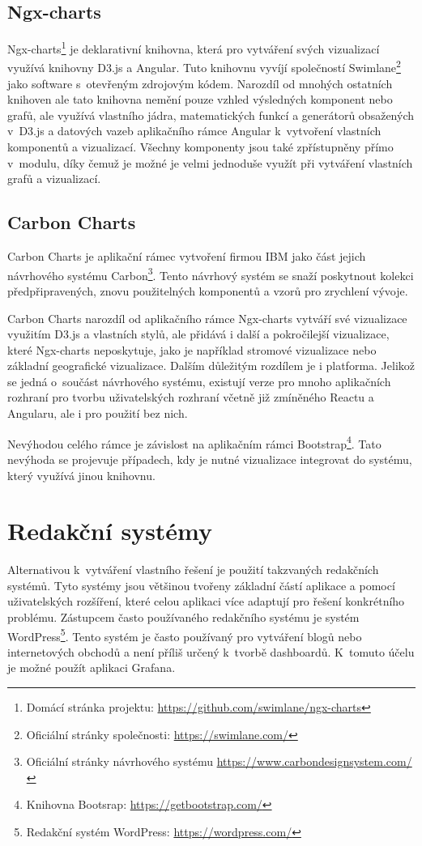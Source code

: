 \subsection*{Ngx-charts}
Ngx-charts\footnote{Domácí stránka projektu: \url{https://github.com/swimlane/ngx-charts}} je deklarativní knihovna, která pro vytváření svých vizualizací využívá knihovny D3.js a Angular. Tuto knihovnu vyvíjí společností Swimlane\footnote{Oficiální stránky společnosti: \url{https://swimlane.com/}} jako software s~otevřeným zdrojovým kódem. Narozdíl od mnohých ostatních knihoven ale tato knihovna nemění pouze vzhled výsledných komponent nebo grafů, ale využívá vlastního jádra, matematických funkcí a generátorů obsažených v~D3.js a datových vazeb aplikačního rámce Angular k~vytvoření vlastních komponentů a vizualizací. Všechny komponenty jsou také zpřístupněny přímo v~modulu, díky čemuž je možné je velmi jednoduše využít při vytváření vlastních grafů a vizualizací.

\subsection*{Carbon Charts}
Carbon Charts je aplikační rámec vytvoření firmou IBM jako část jejich návrhového systému Carbon\footnote{Oficiální stránky návrhového systému \url{https://www.carbondesignsystem.com/}}. Tento návrhový systém se snaží poskytnout kolekci předpřipravených, znovu použitelných komponentů a vzorů pro zrychlení vývoje. 

Carbon Charts narozdíl od aplikačního rámce Ngx-charts vytváří své vizualizace využitím D3.js a vlastních stylů, ale přidává i další a pokročilejší vizualizace, které Ngx-charts neposkytuje, jako je například stromové vizualizace nebo základní geografické vizualizace. Dalším důležitým rozdílem je i platforma. Jelikož se jedná o~součást návrhového systému, existují verze pro mnoho aplikačních rozhraní pro tvorbu uživatelských rozhraní včetně již zmíněného Reactu a Angularu, ale i pro použití bez nich. 

Nevýhodou celého rámce je závislost na aplikačním rámci Bootstrap\footnote{Knihovna Bootsrap: \url{https://getbootstrap.com/}}. Tato nevýhoda se projevuje případech, kdy je nutné vizualizace integrovat do systému, který využívá jinou knihovnu.

\section{Redakční systémy}
Alternativou k~vytváření vlastního řešení je použití takzvaných redakčních systémů. Tyto systémy jsou většinou tvořeny základní částí aplikace a pomocí uživatelských rozšíření, které celou aplikaci více adaptují pro řešení konkrétního problému. Zástupcem často používaného redakčního systému je systém WordPress\footnote{Redakční systém WordPress: \url{https://wordpress.com/}}. Tento systém je často používaný pro vytváření blogů nebo internetových obchodů a není příliš určený k~tvorbě dashboardů. K~tomuto účelu je možné použít aplikaci Grafana.

